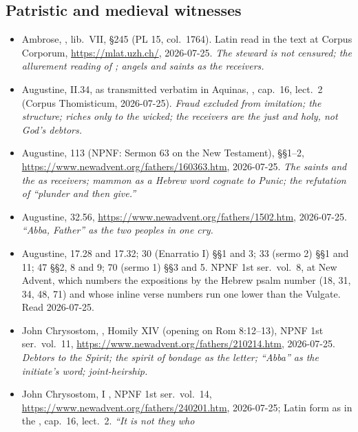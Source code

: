 \subsection*{Patristic and medieval witnesses}

\begin{itemize}[leftmargin=1.3em, itemsep=0.25em]
\item Ambrose, , lib.\ VII, §245 (PL
15, col.\ 1764). Latin read in the  text at Corpus
Corporum, \url{https://mlat.uzh.ch/}, 2026-07-25. \emph{The steward is not
censured; the allurement reading of ; angels and
saints as the receivers.}
\item Augustine,  II.34, as transmitted verbatim
in Aquinas, , cap.\ 16, lect.\ 2 (Corpus
Thomisticum, 2026-07-25). \emph{Fraud excluded from imitation; the  structure; riches only to the wicked; the receivers are the just and
holy, not God's debtors.}
\item Augustine,  113 (NPNF: Sermon 63 on the New Testament), §§1--2,
\url{https://www.newadvent.org/fathers/160363.htm}, 2026-07-25. \emph{The saints
and the  as receivers; mammon as a Hebrew word cognate to Punic;
the refutation of ``plunder and then give.''}
\item Augustine,  32.56,
\url{https://www.newadvent.org/fathers/1502.htm}, 2026-07-25. \emph{``Abba,
Father'' as the two peoples in one cry.}
\item Augustine,  17.28 and 17.32; 30 (Enarratio
I) §§1 and 3; 33 (sermo 2) §§1 and 11; 47 §§2, 8 and 9; 70 (sermo 1) §§3 and 5.
NPNF 1st ser.\ vol.\ 8, at New Advent, which numbers the expositions by the
Hebrew psalm number (18, 31, 34, 48, 71) and whose inline verse numbers run one
lower than the Vulgate. Read 2026-07-25.
\item John Chrysostom, , Homily XIV
(opening on Rom 8:12--13), NPNF 1st ser.\ vol.\ 11,
\url{https://www.newadvent.org/fathers/210214.htm}, 2026-07-25. \emph{Debtors to
the Spirit; the spirit of bondage as the letter; ``Abba'' as the initiate's
word; joint-heirship.}
\item John Chrysostom,  I , NPNF 1st ser.\ vol.\
14, \url{https://www.newadvent.org/fathers/240201.htm}, 2026-07-25; Latin form
as in the \work{Catena aurea}, cap.\ 16, lect.\ 2. \emph{``It is not they who
}
\end{itemize}
